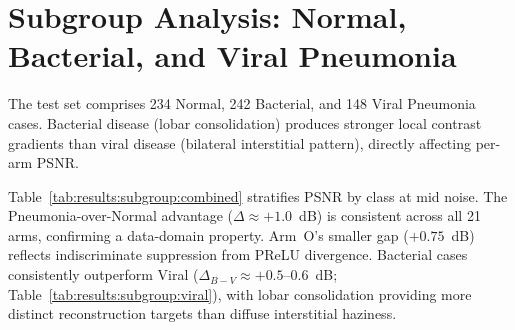 \documentclass[12pt, a4paper, twoside, openright]{book}
\begin{document}
\section{Subgroup Analysis: Normal, Bacterial, and Viral Pneumonia}
\label{sec:results:subgroup}

The test set comprises 234 Normal, 242 Bacterial, and 148 Viral Pneumonia cases. Bacterial disease (lobar consolidation) produces stronger local contrast gradients than viral disease (bilateral interstitial pattern), directly affecting per-arm PSNR.

Table~\ref{tab:results:subgroup:combined} stratifies PSNR by class at mid noise. The Pneumonia-over-Normal advantage ($\Delta\approx+1.0$~dB) is consistent across all 21 arms, confirming a data-domain property. Arm~O's smaller gap ($+0.75$~dB) reflects indiscriminate suppression from PReLU divergence. Bacterial cases consistently outperform Viral ($\Delta_{B-V}\approx+0.5$--$0.6$~dB; Table~\ref{tab:results:subgroup:viral}), with lobar consolidation providing more distinct reconstruction targets than diffuse interstitial haziness.
\end{document}
